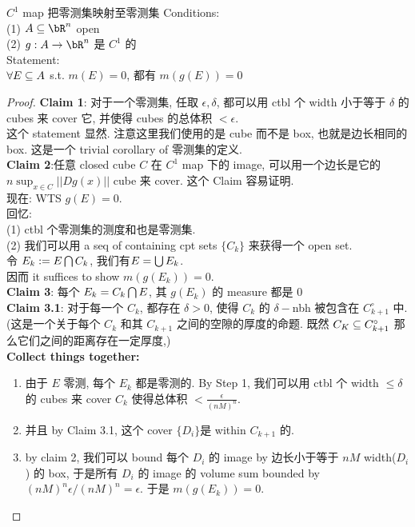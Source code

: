 \documentclass[lang=cn,11pt]{elegantbook}
\begin{document}
\begin{theorem}{$C^1$ map 把零测集映射至零测集}
Conditions:\\
(1) $A \sub \bR^n$ open\\
(2) $g: A \rar \bR^n$ 是 $C^1$ 的\\
Statement:\\
$\forall E\subseteq A $ s.t. $m(E)= 0$, 都有 $m(g(E)) = 0$ 
\end{theorem}
\begin{proof}
\textbf{Claim 1}: 对于一个零测集, 任取 $\epsilon, \delta$, 都可以用 ctbl 个 width 小于等于 $\delta$ 的 cubes 来 cover 它, 并使得 cubes 的总体积 $< \epsilon$.\\
这个 statement 显然. 注意这里我们使用的是 cube 而不是 box, 也就是边长相同的 box. 这是一个 trivial corollary of 零测集的定义.\\
\textbf{Claim 2}:任意 closed cube $C$ 在 $C^1$ map 下的 image, 可以用一个边长是它的 $n\sup_{x \in C} ||Dg(x)||$ cube 来 cover. 这个 Claim 容易证明.\\
现在: WTS $g(E) = 0$.\\
回忆:\\
(1) ctbl 个零测集的测度和也是零测集.\\
(2) 我们可以用 a seq of containing cpt sets $\{C_k \}$ 来获得一个 open set.\\
令 $E_k := E \bigcap C_k$, 我们有$E = \bigcup E_k$.\\
因而 it suffices to show $m(g(E_k)) = 0$.\\
\textbf{Claim 3}: 每个 $E_k = C_k \bigcap E$, 其 $g(E_k)$ 的 measure 都是 0\\
\textbf{Claim 3.1}: 对于每一个 $C_k$, 都存在 $\delta > 0$, 使得 $C_k$ 的 $\delta-$nbh 被包含在 $C_{k+1} ^ {\circ}$ 中. (这是一个关于每个 $C_k$ 和其 $C_{k+1}$ 之间的空隙的厚度的命题. 既然 $C_K \subseteq C_{k+1} ^ {\circ}$ 那么它们之间的距离存在一定厚度,)\\
\textbf{Collect things together:}
\begin{enumerate}
    \item 由于 $E$ 零测, 每个 $E_k$ 都是零测的. By Step 1, 我们可以用 ctbl 个 width $\leq \delta$ 的 cubes 来 cover $C_k$ 使得总体积 $< \frac{\epsilon}{(nM)^n}$. 
    \item 并且 by Claim 3.1, 这个 cover $\{D_i\}$是 within $C_{k+1} $ 的. 
    \item by claim 2, 我们可以 bound 每个 $D_i$ 的 image by 边长小于等于 $nM$ width($D_i$) 的 box, 于是所有 $D_i$ 的 image 的 volume sum bounded by $(nM)^n \epsilon /(nM)^n = \epsilon$. 于是 $m(g(E_k)) = 0$.
\end{enumerate}
\end{proof}
\end{document}
